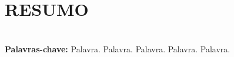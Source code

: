 \thispagestyle{pretext}

\section*{\centering RESUMO}

\lipsum[3] \\

\noindent\textbf{Palavras-chave:} Palavra. Palavra. Palavra. Palavra. Palavra.

\newpage